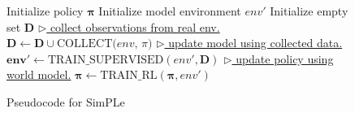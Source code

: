 \begin{figure}  %
\removelatexerror
\begin{algorithm}[H]
\caption{Pseudocode for SimPLe}\label{dpll}
\begin{algorithmic}
\STATE Initialize policy $\boldsymbol\pi$
\STATE Initialize model environment $env'$
\STATE Initialize empty set $\mathbf{D}$
\STATE \underline{$\triangleright$ collect observations from real env.}
\STATE $\mathbf{D} \gets \mathbf{D} \cup \text{COLLECT($env$, $\pi$)}$
\STATE \underline{$\triangleright$ update model using collected data.}
\STATE $\boldsymbol{env'} \gets \text{TRAIN\_SUPERVISED}(env', \mathbf{D})$
\STATE \underline{$\triangleright$ update policy using world model.}
\STATE $\boldsymbol\pi \gets \text{TRAIN\_RL}(\boldsymbol\pi, env')$
\ENDWHILE
\end{algorithmic}
\label{basic_loop}
\label{alg:basic_loop}
\end{algorithm}
\vspace{-0.8cm}
\end{figure}